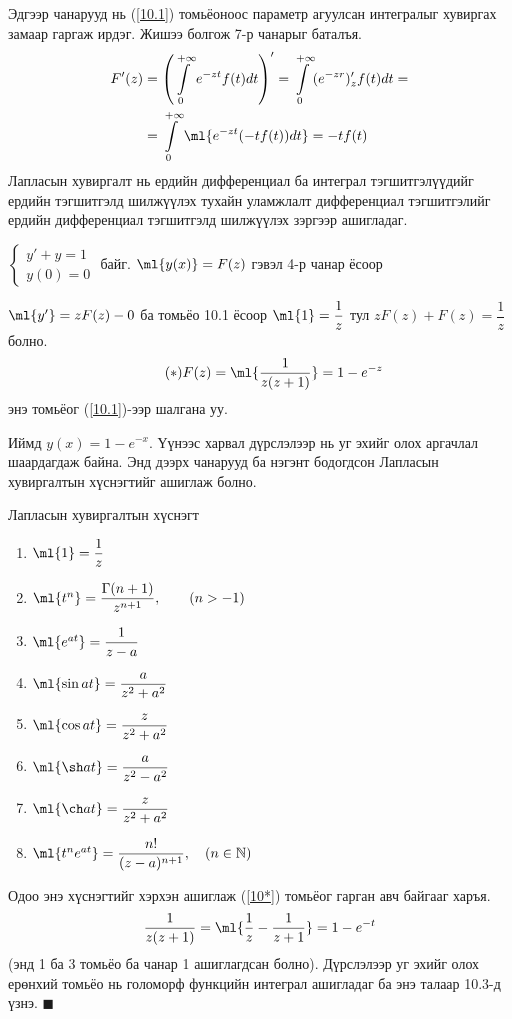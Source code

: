 Эдгээр чанарууд нь (\ref{10.1}) томьёоноос параметр агуулсан интегралыг хувиргах замаар гаргаж ирдэг. Жишээ болгож 7-р чанарыг баталъя.
\begin{align*}
    F'(z)&=\left(\int\limits_0^{+\infty} e^{-zt}f(t)dt\right)'=\int\limits_0^{+\infty} (e^{-zr})'_zf(t)dt=\\
    &=\int\limits_{0}^{+\infty} \ml{e^{-zt}(-tf(t))dt}= -tf(t)
\end{align*}
Лапласын хувиргалт нь ердийн дифференциал ба интеграл тэгшитгэлүүдийг ердийн тэгшитгэлд шилжүүлэх тухайн уламжлалт дифференциал тэгшитгэлийг ердийн дифференциал тэгшитгэлд шилжүүлэх зэргээр ашигладаг.
\begin{exm}
$
\begin{cases}
 y'+y=1 \\
 y(0)=0
\end{cases}$ байг. $\ml{y(x)}=F(z)$ гэвэл 4-р чанар ёсоор  
\end{exm}
\begin{prf}
$\ml{y'}=zF(z)-0$ ба томьёо 10.1 ёсоор $\ml{1}=\dfrac{1}{z}$ тул $zF(z)+F(z)=\dfrac{1}{z}$ болно. 
\begin{equation} \tag{$*$} \label{10*}
 F(z)=\ml{\frac{1}{z(z+1)}}=1-e^{-z}
\end{equation} энэ томьёог (\ref{10.1})-ээр шалгана уу.

Иймд $y(x)=1-e^{-x}$. Үүнээс харвал дүрслэлээр нь уг эхийг олох аргачлал шаардагдаж байна. Энд дээрх чанарууд ба нэгэнт бодогдсон Лапласын хувиргалтын хүснэгтийг ашиглаж болно. 

Лапласын хувиргалтын хүснэгт 
\begin{enumerate}
    \item $\ml{1}=\dfrac{1}{z}$
    \item $\ml{t^n}=\dfrac{\Gamma (n+1)}{z^{n+1}}, \qquad (n>-1)$
    \item $\ml{e^{at}}=\dfrac{1}{z-a}$
    \item $\ml{\sin at}=\dfrac{a}{z^2+a^2}$
    \item $\ml{\cos at}=\dfrac{z}{z^2+a^2}$
    \item $\ml{\sh at}=\dfrac{a}{z^2-a^2}$
    \item $\ml{\ch at}=\dfrac{z}{z^2+a^2}$
    \item $\ml{t^ne^{at}}=\dfrac{n!}{(z-a)^{n+1}}, \quad (n\in\mathbb{N})$
\end{enumerate}
Одоо энэ хүснэгтийг хэрхэн ашиглаж (\ref{10*}) томьёог гарган авч байгааг харъя.
$$\frac{1}{z(z+1)}=\ml{\frac{1}{z}-\frac{1}{z+1}}=1-e^{-t}$$
(энд 1 ба 3 томьёо ба чанар 1 ашиглагдсан болно). Дүрслэлээр уг эхийг олох ерөнхий томьёо нь голоморф функцийн интеграл ашигладаг ба энэ талаар 10.3-д үзнэ.
\hfill $\blacksquare$\end{prf}
